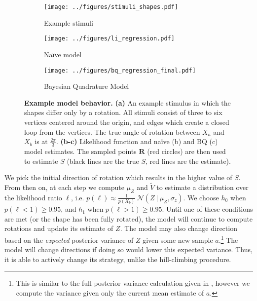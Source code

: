 \documentclass{article} %
\newcommand{\naive}[0]{na\"ive}
\newcommand{\Naive}[0]{Na\"ive}
\begin{document}
\begin{figure}[t]
  \centering
  \begin{subfigure}[b]{0.32\textwidth}
    \centering
    \texttt{[image: ../figures/stimuli\_shapes.pdf]}
    \vspace{0pt}
    \caption{Example stimuli}
    \label{fig:stimuli}
  \end{subfigure}
  \begin{subfigure}[b]{0.32\textwidth}
    \centering
    \texttt{[image: ../figures/li\_regression.pdf]}
    \caption{\Naive{} model}
    \label{fig:li}
  \end{subfigure}
  \begin{subfigure}[b]{0.32\textwidth}
    \centering
    \texttt{[image: ../figures/bq\_regression\_final.pdf]}
    \caption{Bayesian Quadrature Model}
    \vspace{0pt}
    \label{fig:bq}
  \end{subfigure}
  \caption{\textbf{Example model behavior.} \textbf{(a)} An example
    stimulus in which the shapes differ only by a rotation. All
    stimuli consist of three to six vertices centered around the
    origin, and edges which create a closed loop from the
    vertices. The true angle of rotation between $X_a$ and $X_b$ is at
    $\frac{2\pi}{3}$. \textbf{(b-c)} Likelihood function and \naive{}
    (b) and BQ (c) model estimates. The sampled points $\mathbf{R}$
    (red circles) are then used to estimate $S$ (black lines are the
    true $S$, red lines are the estimate).}
  \label{fig:shapes}
\end{figure}

We pick the initial direction of rotation which results in the higher
value of $S$. From then on, at each step we compute $\mu_Z$ and
$\tilde{V}$ to estimate a distribution over the likelihood ratio
$\ell$, i.e.  $p(\ell)\approx\frac{1}{p(X_b)}\ \mathcal{N}(Z\ \vert\
\mu_Z, \sigma_z)$.  We choose $h_0$ when $p(\ell < 1)\geq 0.95$, and
$h_1$ when $p(\ell > 1)\geq 0.95$. Until one of these conditions are
met (or the shape has been fully rotated), the model will continue to
compute rotations and update its estimate of $Z$.  The model may also
change direction based on the \textit{expected} posterior variance of
$Z$ given some new sample $a$.\footnote{This is similar to the full
  posterior variance calculation given in \cite{Osborne:2012tm},
  however we compute the variance given only the current mean estimate
  of $a$.} The model will change directions if doing so would lower
this expected variance. Thus, it is able to actively change its
strategy, unlike the hill-climbing procedure.
\end{document}
